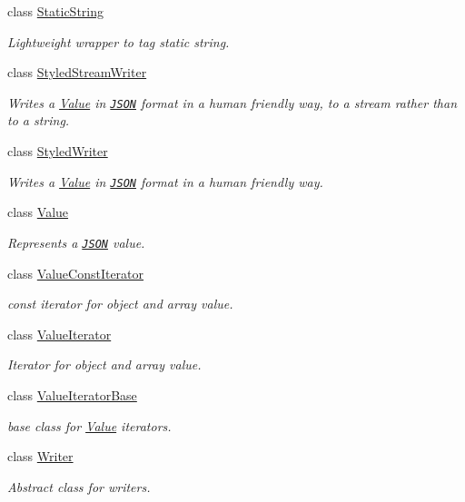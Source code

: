 \begin{DoxyCompactItemize}
class \hyperlink{class_json_1_1_static_string}{Static\+String}
\begin{DoxyCompactList}\small\item\em Lightweight wrapper to tag static string. \end{DoxyCompactList}\item 
class \hyperlink{class_json_1_1_styled_stream_writer}{Styled\+Stream\+Writer}
\begin{DoxyCompactList}\small\item\em Writes a \hyperlink{class_json_1_1_value}{Value} in \href{http://www.json.org}{\tt J\+S\+O\+N} format in a human friendly way, to a stream rather than to a string. \end{DoxyCompactList}\item 
class \hyperlink{class_json_1_1_styled_writer}{Styled\+Writer}
\begin{DoxyCompactList}\small\item\em Writes a \hyperlink{class_json_1_1_value}{Value} in \href{http://www.json.org}{\tt J\+S\+O\+N} format in a human friendly way. \end{DoxyCompactList}\item 
class \hyperlink{class_json_1_1_value}{Value}
\begin{DoxyCompactList}\small\item\em Represents a \href{http://www.json.org}{\tt J\+S\+O\+N} value. \end{DoxyCompactList}\item 
class \hyperlink{class_json_1_1_value_const_iterator}{Value\+Const\+Iterator}
\begin{DoxyCompactList}\small\item\em const iterator for object and array value. \end{DoxyCompactList}\item 
class \hyperlink{class_json_1_1_value_iterator}{Value\+Iterator}
\begin{DoxyCompactList}\small\item\em Iterator for object and array value. \end{DoxyCompactList}\item 
class \hyperlink{class_json_1_1_value_iterator_base}{Value\+Iterator\+Base}
\begin{DoxyCompactList}\small\item\em base class for \hyperlink{class_json_1_1_value}{Value} iterators. \end{DoxyCompactList}\item 
class \hyperlink{class_json_1_1_writer}{Writer}
\begin{DoxyCompactList}\small\item\em Abstract class for writers. \end{DoxyCompactList}\end{DoxyCompactItemize}
